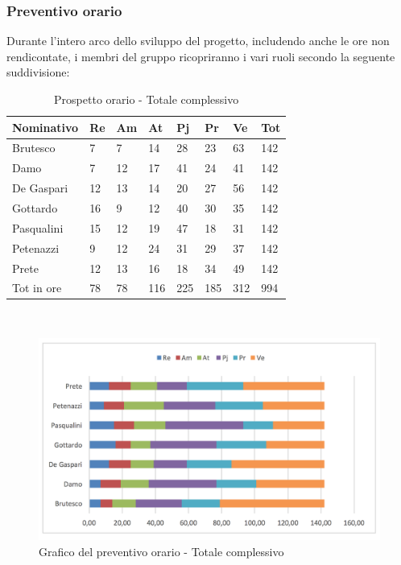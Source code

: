 				\subsubsection {Preventivo orario}
		Durante l'intero arco dello sviluppo del progetto, includendo anche le ore non rendicontate, i membri del gruppo ricopriranno i vari ruoli secondo la seguente suddivisione:\\

								\begin{table}[H] \begin{center} \begin{tabular}{llllllll}
								\toprule
								\textbf{Nominativo}	&	\textbf{Re}	&	\textbf{Am}	&	\textbf{At}	&	\textbf{Pj}	&	\textbf{Pr}	&	\textbf{Ve}	&	\textbf{Tot}\\
								\midrule
								Brutesco	&	7	&	7	&	14	&	28	&	23	&	63	&	142	 \\
								Damo	&	7	&	12	&	17	&	41	&	24	&	41	&	142	 \\
								De Gaspari	&	12	&	13	&	14	&	20	&	27	&	56	&	142	 \\
								Gottardo	&	16	&	9	&	12	&	40	&	30	&	35	&	142	 \\
								Pasqualini	&	15	&	12	&	19	&	47	&	18	&	31	&	142	 \\
								Petenazzi	&	9	&	12	&	24	&	31	&	29	&	37	&	142	 \\
								Prete	&	12	&	13	&	16	&	18	&	34	&	49	&	142	 \\
								\midrule
								Tot in ore	&	78	&	78	&	116	&	225	&	185	&	312	&	994	 \\



								\bottomrule
								\end{tabular} \end{center} \caption{Prospetto orario -
								Totale complessivo
								}\label{tab:h_TotaleComplessivo} \end{table}\mbox{}\\
                        		\begin{figure}[H]  \centering  \includegraphics[scale=0.40]{img/h_Totale}
										\caption{Grafico del preventivo orario - 								Totale complessivo	}  \label{fig:h_TotaleComplessivo} \end{figure}
